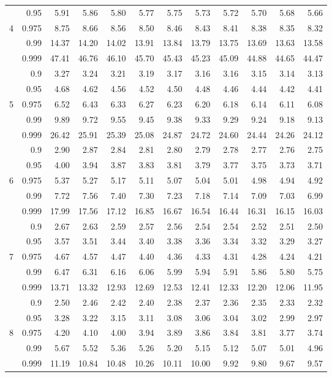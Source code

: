 \documentclass[12pt,a4paper,openany,twoside]{report}
\theoremstyle{definition}
\theoremstyle{remark}
\theoremstyle{plain}
\theoremstyle{definition}
\theoremstyle{definition}
\theoremstyle{definition}
\theoremstyle{remark}
\begin{document}
\begin{center}
\begin{tabular}{rr@{\ }r@{\ }r@{\ }r@{\ }r@{\ }r@{\ }r@{\ }r@{\ }r@{\ }r@{\ }r}
 & 0.95 & 5.91 & 5.86 & 5.80 & 5.77 & 5.75 & 5.73 & 5.72 & 5.70 & 5.68 & 5.66\\
4 & 0.975 & 8.75 & 8.66 & 8.56 & 8.50 & 8.46 & 8.43 & 8.41 & 8.38 & 8.35 & 8.32\\
 & 0.99 & 14.37 & 14.20 & 14.02 & 13.91 & 13.84 & 13.79 & 13.75 & 13.69 & 13.63 & 13.58\\
 & 0.999 & 47.41 & 46.76 & 46.10 & 45.70 & 45.43 & 45.23 & 45.09 & 44.88 & 44.65 & 44.47\\
\rule{0pt}{2.5ex} & 0.9 & 3.27 & 3.24 & 3.21 & 3.19 & 3.17 & 3.16 & 3.16 & 3.15 & 3.14 & 3.13\\
 & 0.95 & 4.68 & 4.62 & 4.56 & 4.52 & 4.50 & 4.48 & 4.46 & 4.44 & 4.42 & 4.41\\
5 & 0.975 & 6.52 & 6.43 & 6.33 & 6.27 & 6.23 & 6.20 & 6.18 & 6.14 & 6.11 & 6.08\\
 & 0.99 & 9.89 & 9.72 & 9.55 & 9.45 & 9.38 & 9.33 & 9.29 & 9.24 & 9.18 & 9.13\\
 & 0.999 & 26.42 & 25.91 & 25.39 & 25.08 & 24.87 & 24.72 & 24.60 & 24.44 & 24.26 & 24.12\\
\rule{0pt}{2.5ex} & 0.9 & 2.90 & 2.87 & 2.84 & 2.81 & 2.80 & 2.79 & 2.78 & 2.77 & 2.76 & 2.75\\
 & 0.95 & 4.00 & 3.94 & 3.87 & 3.83 & 3.81 & 3.79 & 3.77 & 3.75 & 3.73 & 3.71\\
6 & 0.975 & 5.37 & 5.27 & 5.17 & 5.11 & 5.07 & 5.04 & 5.01 & 4.98 & 4.94 & 4.92\\
 & 0.99 & 7.72 & 7.56 & 7.40 & 7.30 & 7.23 & 7.18 & 7.14 & 7.09 & 7.03 & 6.99\\
 & 0.999 & 17.99 & 17.56 & 17.12 & 16.85 & 16.67 & 16.54 & 16.44 & 16.31 & 16.15 & 16.03\\
\rule{0pt}{2.5ex} & 0.9 & 2.67 & 2.63 & 2.59 & 2.57 & 2.56 & 2.54 & 2.54 & 2.52 & 2.51 & 2.50\\
 & 0.95 & 3.57 & 3.51 & 3.44 & 3.40 & 3.38 & 3.36 & 3.34 & 3.32 & 3.29 & 3.27\\
7 & 0.975 & 4.67 & 4.57 & 4.47 & 4.40 & 4.36 & 4.33 & 4.31 & 4.28 & 4.24 & 4.21\\
 & 0.99 & 6.47 & 6.31 & 6.16 & 6.06 & 5.99 & 5.94 & 5.91 & 5.86 & 5.80 & 5.75\\
 & 0.999 & 13.71 & 13.32 & 12.93 & 12.69 & 12.53 & 12.41 & 12.33 & 12.20 & 12.06 & 11.95\\
\rule{0pt}{2.5ex} & 0.9 & 2.50 & 2.46 & 2.42 & 2.40 & 2.38 & 2.37 & 2.36 & 2.35 & 2.33 & 2.32\\
 & 0.95 & 3.28 & 3.22 & 3.15 & 3.11 & 3.08 & 3.06 & 3.04 & 3.02 & 2.99 & 2.97\\
8 & 0.975 & 4.20 & 4.10 & 4.00 & 3.94 & 3.89 & 3.86 & 3.84 & 3.81 & 3.77 & 3.74\\
 & 0.99 & 5.67 & 5.52 & 5.36 & 5.26 & 5.20 & 5.15 & 5.12 & 5.07 & 5.01 & 4.96\\
 & 0.999 & 11.19 & 10.84 & 10.48 & 10.26 & 10.11 & 10.00 & 9.92 & 9.80 & 9.67 & 9.57\\
\end{tabular}
\end{center}
\end{document}
